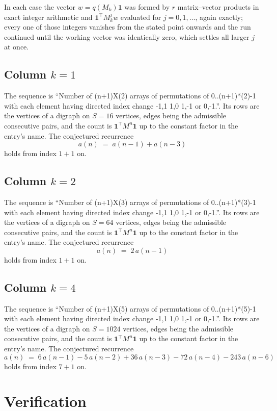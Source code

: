 \documentclass[11pt,a4paper]{article}
\theoremstyle{plain}
\theoremstyle{definition}
\begin{document}
In each case the vector $w=q(M_k)\mathbf{1}$ was formed by $r$ matrix--vector products in
exact integer arithmetic and $\mathbf{1}^{\!\top}M_k^{j}w$ evaluated for $j=0,1,\dots$,
again exactly; every one of those integers vanishes from the stated point onwards and the run
continued until the working vector was identically zero, which settles all larger $j$ at once.

\subsection*{Column $k$$=1$}
The sequence is ``Number of (n+1)X(2) arrays of permutations of 0..(n+1)*(2)-1 with each element having directed index change -1,1 1,0 1,-1 or 0,-1.''. Its rows are the vertices of a digraph on
$S=16$ vertices, edges being the admissible consecutive pairs, and the count is
$\mathbf{1}^{\!\top}M^{n}\mathbf{1}$ up to the constant factor in the entry's name.
The conjectured recurrence
\[
a(n)\;=\;a(n-1) + a(n-3)
\]
holds from index $1+1$ on.

\subsection*{Column $k$$=2$}
The sequence is ``Number of (n+1)X(3) arrays of permutations of 0..(n+1)*(3)-1 with each element having directed index change -1,1 1,0 1,-1 or 0,-1.''. Its rows are the vertices of a digraph on
$S=64$ vertices, edges being the admissible consecutive pairs, and the count is
$\mathbf{1}^{\!\top}M^{n}\mathbf{1}$ up to the constant factor in the entry's name.
The conjectured recurrence
\[
a(n)\;=\;2\,a(n-1)
\]
holds from index $1+1$ on.

\subsection*{Column $k$$=4$}
The sequence is ``Number of (n+1)X(5) arrays of permutations of 0..(n+1)*(5)-1 with each element having directed index change -1,1 1,0 1,-1 or 0,-1.''. Its rows are the vertices of a digraph on
$S=1024$ vertices, edges being the admissible consecutive pairs, and the count is
$\mathbf{1}^{\!\top}M^{n}\mathbf{1}$ up to the constant factor in the entry's name.
The conjectured recurrence
\[
a(n)\;=\;6\,a(n-1) - 5\,a(n-2) + 36\,a(n-3) - 72\,a(n-4) - 243\,a(n-6)
\]
holds from index $7+1$ on.

\section{Verification}
\end{document}
